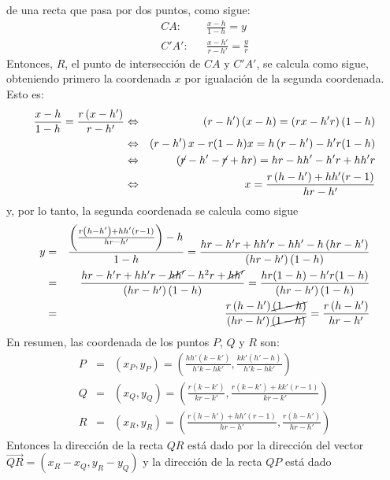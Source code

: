 \begin{solucion}
 de una recta que pasa por dos puntos, como sigue:
 \begin{eqnarray*}
  CA: & & \frac{x-h}{1-h} = y \\
  C'A': & & \frac{x-h'}{r-h'} = \frac{y}{r}
 \end{eqnarray*}
 Entonces, $R$, el punto de intersecci\'on de $CA$ y $C'A'$,
 se calcula como sigue, obteniendo primero la coordenada $x$
 por igualaci\'on de la segunda coordenada. Esto es:
 \begin{eqnarray*}
  \frac{x-h}{1-h} = \frac{r\left(x-h'\right)}{r-h'} & \Leftrightarrow & 
  \left( r-h' \right)(x-h) = \left( rx-h'r \right)(1-h) \\
  & \Leftrightarrow &
  \left( r-h' \right)x - r(1-h)x = h\left( r-h' \right) - h'r(1-h) \\
  & \Leftrightarrow &
  \left( \cancel{r} - h' - \cancel{r} + hr \right) =
  hr-hh'-h'r + hh'r \\
  & \Leftrightarrow & 
  x = \frac{r\left( h - h' \right) + hh'(r-1)}{hr-h'}
 \end{eqnarray*}
 y, por lo tanto, la segunda coordenada se calcula como sigue
 \begin{eqnarray*}
  y & = & 
  \frac{\left(\frac{r\left(h-h'\right) + hh'(r-1)}{hr-h'}\right)-h}{1-h} 
  = \frac{hr-h'r+hh'r-hh'-h\left(hr-h'\right)}{\left(hr-h'\right)(1-h)}
  \\ & = & 
  \frac{hr-h'r+hh'r-\cancel{hh'}-h^2r+\cancel{hh'}}{\left(hr-h'\right)(1-h)}
  = \frac{hr(1-h)-h'r(1-h)}{\left(hr-h'\right)(1-h)} \\
  & = & 
  \frac{r\left(h-h'\right)\cancel{(1-h)}}{\left(hr-h'\right)\cancel{(1-h)}}
  = \frac{r\left(h-h'\right)}{hr-h'}
 \end{eqnarray*}
 En resumen, las coordenada de los puntos $P$, $Q$ y $R$ son:
 \begin{eqnarray*}
  P & = & \left( x_P, y_P \right) =
  \left( \frac{hh'\left( k-k' \right)}{h'k-hk'}, 
  \frac{kk'\left( h'-h \right)}{h'k-hk'} \right) \\
  Q & = & \left( x_Q, y_Q \right) =
  \left( \frac{r\left( k-k' \right)}{kr-k'}, 
  \frac{r\left( k-k' \right) + kk'(r-1)}{kr-k'} \right) \\
  R & = & \left( x_R, y_R \right) =
  \left( \frac{r\left( h - h' \right) + hh'(r-1)}{hr-h'},
  \frac{r\left(h-h'\right)}{hr-h'} \right)
 \end{eqnarray*}
 Entonces la direcci\'on de la recta $QR$ est\'a dado
 por la direcci\'on del vector
 $\overrightarrow{QR} = \left( x_R-x_Q, y_R-y_Q \right)$ 
 y la direcci\'on de la recta $QP$ est\'a dado

\end{solucion}
